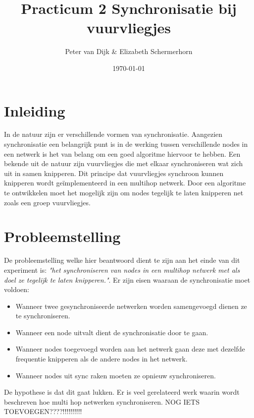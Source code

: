 \documentclass{article}
\author{Peter van Dijk \& Elizabeth Schermerhorn}
\date{\today}
\title{Practicum 2 Synchronisatie bij vuurvliegjes}
\begin{document}
\maketitle
\newpage
\tableofcontents
\clearpage
\section{Inleiding}
In de natuur zijn er verschillende vormen van synchronisatie. Aangezien synchronisatie een belangrijk punt is in de werking tussen verschillende nodes in een netwerk is het van belang om een goed algoritme hiervoor te hebben. Een bekende uit de natuur zijn vuurvliegjes die met elkaar synchroniseren wat zich uit in samen knipperen. Dit principe dat vuurvliegjes synchroon kunnen knipperen wordt ge\"{i}mplementeerd in een multihop netwerk. Door een algoritme te ontwikkelen moet het mogelijk zijn om nodes tegelijk te laten knipperen net zoals een groep vuurvliegjes. 
\section{Probleemstelling}
De probleemstelling welke hier beantwoord dient te zijn aan het einde van dit experiment is: \textit{"het synchroniseren van nodes in een multihop netwerk met als doel ze tegelijk te laten knipperen."}. Er zijn eisen waaraan de synchronisatie moet voldoen:
 \begin{itemize}
 \item Wanneer twee gesynchroniseerde netwerken worden samengevoegd dienen ze te synchroniseren.
 \item Wanneer een node uitvalt dient de synchronisatie door te gaan.
 \item Wanneer nodes toegevoegd worden aan het netwerk gaan deze met dezelfde frequentie knipperen als de andere nodes in het netwerk.
 \item Wanneer nodes uit sync raken moeten ze opnieuw synchroniseren. 
 \end{itemize}
De hypothese is dat dit gaat lukken. Er is veel gerelateerd werk waarin wordt beschreven hoe multi hop netwerken synchroniseren. 
NOG IETS TOEVOEGEN????!!!!!!!!!!
\end{document}

